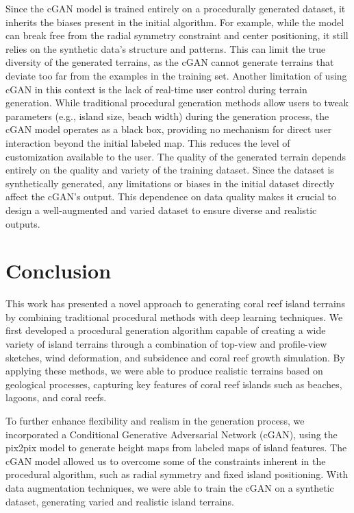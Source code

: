 \begin{Itemize}
     Since the cGAN model is trained entirely on a procedurally generated dataset, it inherits the biases present in the initial algorithm. For example, while the model can break free from the radial symmetry constraint and center positioning, it still relies on the synthetic data's structure and patterns. This can limit the true diversity of the generated terrains, as the cGAN cannot generate terrains that deviate too far from the examples in the training set.
     Another limitation of using cGAN in this context is the lack of real-time user control during terrain generation. While traditional procedural generation methods allow users to tweak parameters (e.g., island size, beach width) during the generation process, the cGAN model operates as a black box, providing no mechanism for direct user interaction beyond the initial labeled map. This reduces the level of customization available to the user.
     The quality of the generated terrain depends entirely on the quality and variety of the training dataset. Since the dataset is synthetically generated, any limitations or biases in the initial dataset directly affect the cGAN's output. This dependence on data quality makes it crucial to design a well-augmented and varied dataset to ensure diverse and realistic outputs.
\end{Itemize}



\section{Conclusion}

This work has presented a novel approach to generating coral reef island terrains by combining traditional procedural methods with deep learning techniques. We first developed a procedural generation algorithm capable of creating a wide variety of island terrains through a combination of top-view and profile-view sketches, wind deformation, and subsidence and coral reef growth simulation. By applying these methods, we were able to produce realistic terrains based on geological processes, capturing key features of coral reef islands such as beaches, lagoons, and coral reefs.

To further enhance flexibility and realism in the generation process, we incorporated a Conditional Generative Adversarial Network (cGAN), using the pix2pix model to generate height maps from labeled maps of island features. The cGAN model allowed us to overcome some of the constraints inherent in the procedural algorithm, such as radial symmetry and fixed island positioning. With data augmentation techniques, we were able to train the cGAN on a synthetic dataset, generating varied and realistic island terrains.

